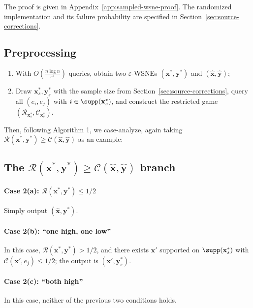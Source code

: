The proof is given in Appendix~\ref{app:sampled-wsne-proof}. The randomized implementation and its failure probability are specified in Section~\ref{sec:source-corrections}.

\subsection{Preprocessing}

\begin{enumerate}
  \item With \(O\left(\frac{n \log n}{\varepsilon^4}\right)\) queries, obtain two \(\varepsilon\)-WSNEs \((\mathbf{x}^*, \mathbf{y}^*)\) and \((\hat{\mathbf{x}}, \hat{\mathbf{y}})\);
  \item Draw \(\mathbf{x}_s^*, \mathbf{y}_s^*\) with the sample size from Section~\ref{sec:source-corrections}, query all \((e_i, e_j)\) with \(i \in \supp(\mathbf{x}_s^*)\), and construct the restricted game \((\mathcal{R}_{\mathbf{x}_s^*}, \mathcal{C}_{\mathbf{x}_s^*})\).
\end{enumerate}

Then, following Algorithm 1, we case-analyze, again taking \(\mathcal{R}(\mathbf{x}^*,\mathbf{y}^*) \ge \mathcal{C}(\hat{\mathbf{x}},\hat{\mathbf{y}})\) as an example:

\subsection{The \texorpdfstring{\(\mathcal{R}(\mathbf{x}^*, \mathbf{y}^*) \ge \mathcal{C}(\hat{\mathbf{x}}, \hat{\mathbf{y}})\)}{R(x*,y*) >= C(xh,yh)} branch}

\paragraph{Case 2(a): \(\mathcal{R}(\mathbf{x}^*,\mathbf{y}^*) \le 1/2\)}
Simply output \((\hat{\mathbf{x}}, \mathbf{y}^*)\).

\paragraph{Case 2(b): ``one high, one low''}
In this case, \(\mathcal{R}(\mathbf{x}^*,\mathbf{y}^*) > 1/2\), and there exists \(\mathbf{x}'\) supported on \(\supp(\mathbf{x}_s^*)\) with \(\mathcal{C}(\mathbf{x}', e_j) \le 1/2\); the output is \((\mathbf{x}', \mathbf{y}_s^*)\).

\paragraph{Case 2(c): ``both high''}
In this case, neither of the previous two conditions holds.

